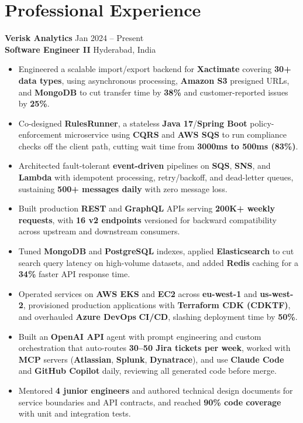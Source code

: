\documentclass[a4paper,10pt]{article}
\begin{document}
\section*{Professional Experience}

\textbf{Verisk Analytics} \hfill Jan 2024 -- Present \\
\textbf{Software Engineer II} \hfill Hyderabad, India

\begin{itemize}[leftmargin=*]
    \item Engineered a scalable import/export backend for \textbf{Xactimate} covering \textbf{30+ data types}, using asynchronous processing, \textbf{Amazon S3} presigned URLs, and \textbf{MongoDB} to cut transfer time by \textbf{38\%} and customer-reported issues by \textbf{25\%}.
    \item Co-designed \textbf{RulesRunner}, a stateless \textbf{Java 17}/\textbf{Spring Boot} policy-enforcement microservice using \textbf{CQRS} and \textbf{AWS SQS} to run compliance checks off the client path, cutting wait time from \textbf{3000ms to 500ms (83\%)}.
    \item Architected fault-tolerant \textbf{event-driven} pipelines on \textbf{SQS}, \textbf{SNS}, and \textbf{Lambda} with idempotent processing, retry/backoff, and dead-letter queues, sustaining \textbf{500+ messages daily} with zero message loss.
    \item Built production \textbf{REST} and \textbf{GraphQL} APIs serving \textbf{200K+ weekly requests}, with \textbf{16 v2 endpoints} versioned for backward compatibility across upstream and downstream consumers.
    \item Tuned \textbf{MongoDB} and \textbf{PostgreSQL} indexes, applied \textbf{Elasticsearch} to cut search query latency on high-volume datasets, and added \textbf{Redis} caching for a \textbf{34\%} faster API response time.
    \item Operated services on \textbf{AWS EKS} and \textbf{EC2} across \textbf{eu-west-1} and \textbf{us-west-2}, provisioned production applications with \textbf{Terraform CDK (CDKTF)}, and overhauled \textbf{Azure DevOps} \textbf{CI/CD}, slashing deployment time by \textbf{50\%}.
    \item Built an \textbf{OpenAI API} agent with prompt engineering and custom orchestration that auto-routes \textbf{30--50 Jira tickets per week}, worked with \textbf{MCP} servers (\textbf{Atlassian}, \textbf{Splunk}, \textbf{Dynatrace}), and use \textbf{Claude Code} and \textbf{GitHub Copilot} daily, reviewing all generated code before merge.
    \item Mentored \textbf{4 junior engineers} and authored technical design documents for service boundaries and API contracts, and reached \textbf{90\% code coverage} with unit and integration tests.
\end{itemize}
\end{document}
